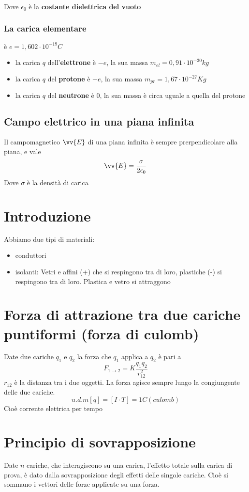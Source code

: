 \documentclass[a4paper]{report}
\begin{document}
  Dove $\epsilon_0$ è la \textbf{costante dielettrica del vuoto}
  \subsubsection{La carica elementare}
  è $e = 1,602 \cdot 10^{-19} C$
  \begin{itemize}
    \item la carica $q$ dell'\textbf{elettrone} è $-e$, la sua massa $m_{el} = 0,91 \cdot 10^{-30} kg$
    \item la carica $q$ del \textbf{protone} è $+e$, la sua massa $m_{pr} = 1,67 \cdot 10^{-27} Kg$
    \item la carica $q$ del \textbf{neutrone} è $0$, la sua massa è circa uguale a quella del protone
  \end{itemize}

  \subsection{Campo elettrico in una piana infinita}
  Il campomagnetico $\vv{E}$ di una piana infinita è sempre prerpendicolare alla piana, e vale
  $$ \vv{E} = \frac{\sigma}{2\epsilon_0} $$
  Dove $\sigma$ è la densità di carica

  \section{Introduzione}
  Abbiamo due tipi di materiali:
  \begin{itemize}
    \item conduttori
    \item isolanti: Vetri e affini (+) che si respingono tra di loro, plastiche (-) si respingono tra di loro. Plastica e vetro si attraggono
  \end{itemize}

  \section{Forza di attrazione tra due cariche puntiformi (forza di culomb)}
  Date due cariche $q_1$ e $q_2$ la forza che $q_1$ applica a $q_2$ è pari a
  $$ F_{1 \rightarrow 2} = K \frac{q_1 q_2}{r_{12}^2} $$
  $r_{12}$ è la distanza tra i due oggetti. La forza agisce sempre lungo la congiungente delle due cariche.
  $$u.d.m[q] = [I\cdot T] = 1C (culomb)$$
  Cioè corrente elettrica per tempo

  \section{Principio di sovrapposizione}
  Date $n$ cariche, che interagiscono su una carica, l'effetto totale sulla carica di prova, è dato dalla sovrapposizione degli effetti delle singole cariche. Cioè si sommano i vettori delle forze applicate su una forza.
\end{document}

